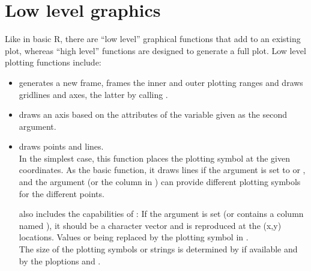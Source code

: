 \documentclass[11pt]{article}\usepackage[]{graphicx}\usepackage[]{color}
\begin{document}
\section{Low level graphics}

Like in basic R, there are ``low level'' graphical functions that
add to an existing plot, whereas ``high level'' functions are designed to 
generate a full plot. Low level plotting functions include:

\begin{itemize}
\item 
   generates a new frame, frames the inner and outer plotting
  ranges and draws gridlines and axes, the latter by calling . 
\item
   draws an axis based on the attributes of the variable given as
  the second argument.   
\item
{} draws points and lines. \\
  In the simplest case, this function places the plotting symbol at the
  given coordinates. As the basic  function, it draws lines if 
  the argument  is set to  or , and the argument
   (or the column  in ) can provide
  different plotting symbols for the different points.

   also includes the capabilities of : 
  If the argument  
  is set (or  contains a column named ),
  it should be a character vector and is reproduced at the (x,y) locations.
  Values  or  being replaced by the plotting symbol in .\\
  The size of the plotting symbols or strings is determined by
   if available and by the ploptions
   and .


\end{itemize}
\end{document}
